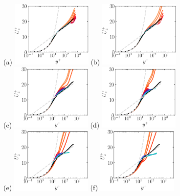 \documentclass[lineno]{jfm}
\begin{document}
	 
        \begin{figure}
    	\centering
		(a) \includegraphics[width=4cm]{Figures/prof_uzplus_rotz0_roty0.00390625.eps}
                (b) \includegraphics[width=4cm]{Figures/prof_uzplus_rotz0_roty0.0078125.eps} \\
                (c) \includegraphics[width=4cm]{Figures/prof_uzplus_rotz0_roty0.015625.eps}
                (d) \includegraphics[width=4cm]{Figures/prof_uzplus_rotz0_roty0.03125.eps} \\
                (e) \includegraphics[width=4cm]{Figures/prof_uzplus_rotz0_roty0.0625.eps}
                (f) \includegraphics[width=4cm]{Figures/prof_uzplus_rotz0_roty0.125.eps} \\

\end{figure}
\end{document}
